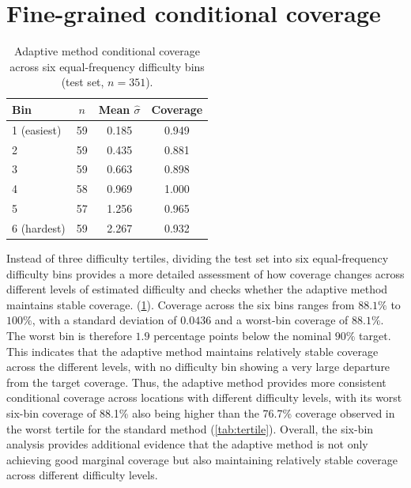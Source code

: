 \section{Fine-grained conditional coverage}
\begin{table}[H]
\centering
\caption{Adaptive method conditional coverage across six equal-frequency difficulty bins (test set, $n=351$).}
\label{tab:sixbin}
\begin{tabular}{lccc}
\toprule
Bin & $n$ & Mean $\hat\sigma$ & Coverage \\
\midrule
1 (easiest) & 59 & 0.185 & 0.949 \\
2 & 59 & 0.435 & 0.881 \\
3 & 59 & 0.663 & 0.898 \\
4 & 58 & 0.969 & 1.000 \\
5 & 57 & 1.256 & 0.965 \\
6 (hardest) & 59 & 2.267 & 0.932 \\
\bottomrule
\end{tabular}
\end{table}
Instead of three difficulty tertiles, dividing the test set into six equal-frequency difficulty bins provides a more detailed assessment of how coverage changes across different levels of estimated difficulty and checks whether the adaptive method maintains stable coverage.  (\cref{tab:sixbin}). Coverage across the six bins ranges from $88.1\%$ to $100\%$, with a standard deviation of $0.0436$ and a worst-bin coverage of $88.1\%$. The worst bin is therefore $1.9$ percentage points below the nominal $90\%$ target. This indicates that the adaptive method maintains relatively stable coverage across the different levels, with no difficulty bin showing a very large departure from the target coverage. Thus, the adaptive method provides more consistent conditional coverage across locations with different difficulty levels, with its worst six-bin coverage of 88.1\% also being higher than the 76.7\% coverage observed in the worst tertile for the standard method (\cref{tab:tertile}). Overall, the six-bin analysis provides additional evidence that the adaptive method is not only achieving good marginal coverage but also maintaining relatively stable coverage across different difficulty levels.

